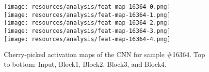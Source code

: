 \begin{figure}[ht]
    \centering
    \texttt{[image: resources/analysis/feat-map-16364-0.png]}\\
    \texttt{[image: resources/analysis/feat-map-16364-1.png]}\\
    \texttt{[image: resources/analysis/feat-map-16364-2.png]}\\
    \texttt{[image: resources/analysis/feat-map-16364-3.png]}\\
    \texttt{[image: resources/analysis/feat-map-16364-4.png]}\\
    \caption[Activation maps of the CNN for sample \#16364]{Cherry-picked activation maps of the CNN for sample \#16364. Top to bottom: Input, Block1, Block2, Block3, and Block4.}
    \label{fig:activationmaps3}
\end{figure}
\clearpage
